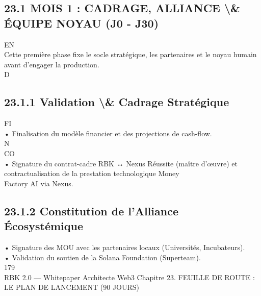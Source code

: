 \subsection{23.1 MOIS 1 : CADRAGE, ALLIANCE \textbackslash{}& ÉQUIPE NOYAU (J0 - J30)}
\vspace{0.5em}
\vspace{0.5em}
\vspace{0.5em}
\vspace{0.5em}
EN\\
Cette première phase fixe le socle stratégique, les partenaires et le noyau humain avant d’engager la production.\\
\vspace{0.5em}
\vspace{0.5em}
\vspace{0.5em}
\vspace{0.5em}
D\\
\subsection{23.1.1 Validation \textbackslash{}& Cadrage Stratégique}
\vspace{0.5em}
\vspace{0.5em}
\vspace{0.5em}
\vspace{0.5em}
FI\\
• Finalisation du modèle financier et des projections de cash-flow.\\
N\\
CO\\
• Signature du contrat-cadre RBK ↔ Nexus Réussite (maître d’œuvre) et contractualisation de la prestation technologique Money\\
Factory AI via Nexus.\\
\vspace{0.5em}
\vspace{0.5em}
\subsection{23.1.2 Constitution de l’Alliance Écosystémique}
• Signature des MOU avec les partenaires locaux (Universités, Incubateurs).\\
\vspace{0.5em}
• Validation du soutien de la Solana Foundation (Superteam).\\
\vspace{0.5em}
\vspace{0.5em}
\vspace{0.5em}
\vspace{0.5em}
179\\
RBK 2.0 — Whitepaper Architecte Web3                                   Chapitre 23. FEUILLE DE ROUTE : LE PLAN DE LANCEMENT (90 JOURS)\\
\vspace{0.5em}
\vspace{0.5em}
